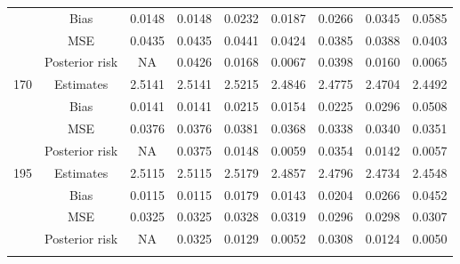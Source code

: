 \documentclass[a4paper,12pt]{report}
\begin{document}
{\begin{minipage}{\linewidth}
{\begin{tabular}{|c|c|c|c|c|c|c|c|c|}
			&Bias           &0.0148 &0.0148 &0.0232 &0.0187 &0.0266 &0.0345 &0.0585 \\
			&MSE            &0.0435 &0.0435 &0.0441 &0.0424 &0.0385 &0.0388 &0.0403 \\
			&Posterior risk    &NA &0.0426 &0.0168 &0.0067 &0.0398 &0.0160 &0.0065 \\ \hline
			170		&Estimates      &2.5141 &2.5141 &2.5215 &2.4846 &2.4775 &2.4704 &2.4492 \\
			&Bias           &0.0141 &0.0141 &0.0215 &0.0154 &0.0225 &0.0296 &0.0508 \\
			&MSE            &0.0376 &0.0376 &0.0381 &0.0368 &0.0338 &0.0340 &0.0351 \\
			&Posterior risk    &NA &0.0375 &0.0148 &0.0059 &0.0354 &0.0142 &0.0057 \\ \hline
			195		&Estimates      &2.5115 &2.5115 &2.5179 &2.4857 &2.4796 &2.4734 &2.4548 \\
			&Bias           &0.0115 &0.0115 &0.0179 &0.0143 &0.0204 &0.0266 &0.0452 \\
			&MSE            &0.0325 &0.0325 &0.0328 &0.0319 &0.0296 &0.0298 &0.0307 \\
			&Posterior risk    &NA &0.0325 &0.0129 &0.0052 &0.0308 &0.0124 &0.0050 \\ \hline
			\ECC
		\end{tabular}
	}
\end{minipage}
\newpage

{\\\vspace{1cm}}

}
\end{document}
